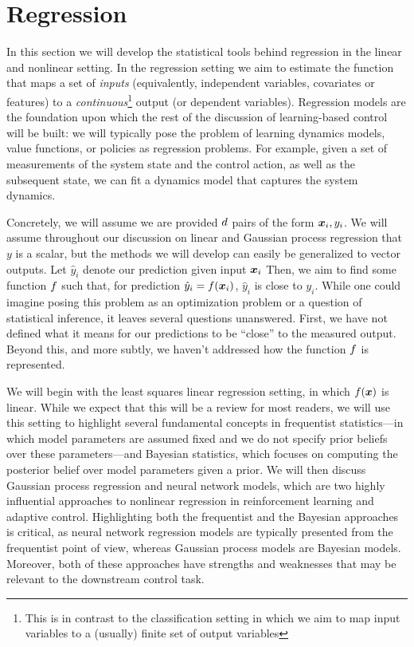 \chapter{Regression}

In this section we will develop the statistical tools behind regression in the linear and nonlinear setting. In the regression setting we aim to estimate the function that maps a set of \textit{inputs} (equivalently, independent variables, covariates or features) to a \textit{continuous}\footnote{This is in contrast to the classification setting in which we aim to map input variables to a (usually) finite set of output variables} output (or dependent variables). 
Regression models are the foundation upon which the rest of the discussion of learning-based control will be built: we will typically pose the problem of learning dynamics models, value functions, or policies as regression problems. 
For example, given a set of measurements of the system state and the control action, as well as the subsequent state, we can fit a dynamics model that captures the system dynamics. 

Concretely, we will assume we are provided $d$ pairs of the form $\bm{x}_i, y_i$. We will assume throughout our discussion on linear and Gaussian process regression that $y$ is a scalar, but the methods we will develop can easily be generalized to vector outputs. Let $\hat{y}_i$ denote our prediction given input $\bm{x}_i$ Then, we aim to find some function $f$ such that, for prediction $\hat{y}_i = f(\bm{x}_i)$, $\hat{y}_i$ is close to $y_i$. While one could imagine posing this problem as an optimization problem or a question of statistical inference, it leaves several questions unanswered. First, we have not defined what it means for our predictions to be ``close'' to the measured output. Beyond this, and more subtly, we haven't addressed how the function $f$ is represented. 

We will begin with the least squares linear regression setting, in which $f(\bm{x})$ is linear. While we expect that this will be a review for most readers, we will use this setting to highlight several fundamental concepts in frequentist statistics---in which model parameters are assumed fixed and we do not specify prior beliefs over these parameters---and Bayesian statistics, which focuses on computing the posterior belief over model parameters given a prior. We will then discuss Gaussian process regression and neural network models, which are two highly influential approaches to nonlinear regression in reinforcement learning and adaptive control. Highlighting both the frequentist and the Bayesian approaches is critical, as neural network regression models are typically presented from the frequentist point of view, whereas Gaussian process models are Bayesian models. Moreover, both of these approaches have strengths and weaknesses that may be relevant to the downstream control task.

